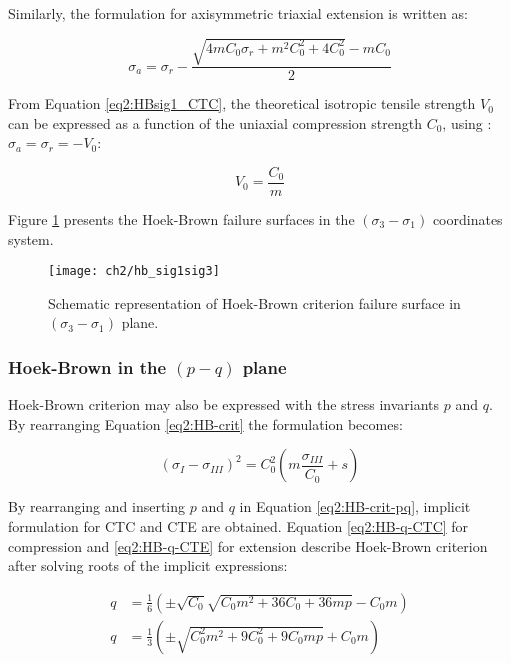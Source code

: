 Similarly, the formulation for axisymmetric triaxial extension is written as:

\begin{equation}\label{eq2:HBsig1_CTE}
    \sigma_{a}=\sigma_{r} - \frac{\sqrt{4 m C_{0} \sigma_{r}+m^{2} C_{0}^{2}+4 C_{0}^{2}}-m C_{0}}{2}
\end{equation}

From Equation \ref{eq2:HBsig1_CTC}, the theoretical isotropic tensile strength $V_0$ can be expressed as a function of the uniaxial compression strength $C_0$, using : $\sigma_a = \sigma_r = -V_0$:

\begin{equation}
    V_0 = \frac{C_0}{m}
\end{equation}

Figure \ref{fig2:hb_sig1sig3} presents the Hoek-Brown failure surfaces in the $(\sigma_3 -\sigma_1)$ coordinates system. 

\begin{figure}[tb]
    \centering
    \texttt{[image: ch2/hb\_sig1sig3]}
    \caption{Schematic representation of Hoek-Brown criterion failure surface in $(\sigma_3 -\sigma_1)$ plane.}
    \label{fig2:hb_sig1sig3}
\end{figure} 

\subsubsection{Hoek-Brown in the \texorpdfstring{$(p-q)$}{p-q} plane}

Hoek-Brown criterion may also be expressed with the stress invariants $p$ and $q$. By rearranging Equation \ref{eq2:HB-crit} the formulation becomes:

\begin{equation}\label{eq2:HB-crit-pq}
    \left(\sigma_{I}-\sigma_{III}\right)^{2}=C_{0}^{2}\left(m \frac{\sigma_{III}}{C_{0}}+s\right)
\end{equation}

By rearranging and inserting $p$  and $q$ in Equation \ref{eq2:HB-crit-pq}, implicit formulation for CTC and CTE are obtained. Equation \ref{eq2:HB-q-CTC} for compression and \ref{eq2:HB-q-CTE} for extension describe Hoek-Brown criterion after solving roots of the implicit expressions:  


\begin{align}
    q&=\frac{1}{6}\left(\pm \sqrt{C_{0}} \sqrt{C_{0} m^{2}+36 C_{0}+36 m p}-C_{0} m\right) \label{eq2:HB-q-CTC} \\
    q&=\frac{1}{3}\left(\pm \sqrt{C_{0}^{2} m^{2}+9 C_{0}^{2}+9 C_{0} m p}+C_{0} m\right) \label{eq2:HB-q-CTE}
\end{align}

